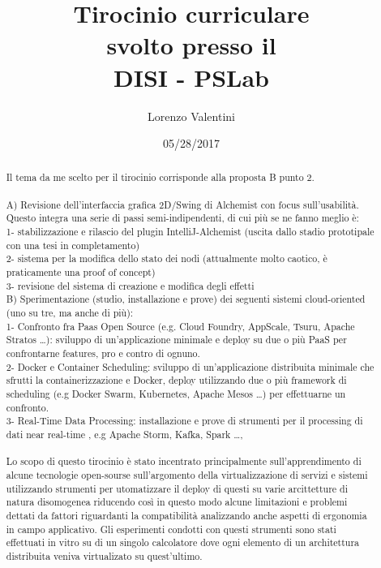 \documentclass[a4paper,12pt,openright,twoside]{report}
\title{Tirocinio curriculare \\svolto presso il\\ DISI - PSLab}
\author{Lorenzo Valentini}
\date{05/28/2017}
\begin{document}
	
\maketitle

\begin{abstract}
		Il tema da me scelto per il tirocinio corrisponde alla proposta B punto 2.\\\\
	A) Revisione dell'interfaccia grafica 2D/Swing di Alchemist con focus
	sull'usabilità. Questo integra una serie di passi semi-indipendenti,
	di cui più se ne fanno meglio è:\\
	1- stabilizzazione e rilascio del plugin IntelliJ-Alchemist (uscita
	dallo stadio prototipale con una tesi in completamento)\\
	2- sistema per la modifica dello stato dei nodi (attualmente molto
	caotico, è praticamente una proof of concept)\\
	3- revisione del sistema di creazione e modifica degli effetti\\
	
	B) Sperimentazione (studio, installazione e prove) dei seguenti sistemi
	cloud-oriented (uno su tre, ma anche di più):\\
	1- Confronto fra Paas Open Source (e.g. Cloud Foundry, AppScale,
	Tsuru, Apache Stratos …): sviluppo di un’applicazione minimale e deploy
	su due o più PaaS per confrontarne features, pro e contro di ognuno.\\
	2- Docker e Container Scheduling: sviluppo di un’applicazione
	distribuita minimale che sfrutti la containerizzazione e Docker, deploy
	utilizzando due o più framework di scheduling (e.g Docker Swarm,
	Kubernetes, Apache Mesos …) per effettuarne un confronto.\\
	3- Real-Time Data Processing: installazione e prove di strumenti per
	il processing di dati near real-time , e.g Apache Storm, Kafka, Spark …,\\\\
	
	Lo scopo di questo tirocinio è stato incentrato principalmente sull'apprendimento di alcune tecnologie open-sourse  sull'argomento della virtualizzazione di servizi e sistemi utilizzando strumenti per utomatizzare il deploy di questi su varie arcittetture di natura disomogenea riducendo così in questo modo alcune limitazioni e problemi dettati da fattori riguardanti la compatibilità analizzando anche aspetti di ergonomia in campo applicativo.
	Gli esperimenti condotti con questi strumenti sono stati effettuati in vitro su di un singolo calcolatore dove ogni elemento di un architettura distribuita veniva virtualizato su quest'ultimo.


\end{abstract}
\end{document}
